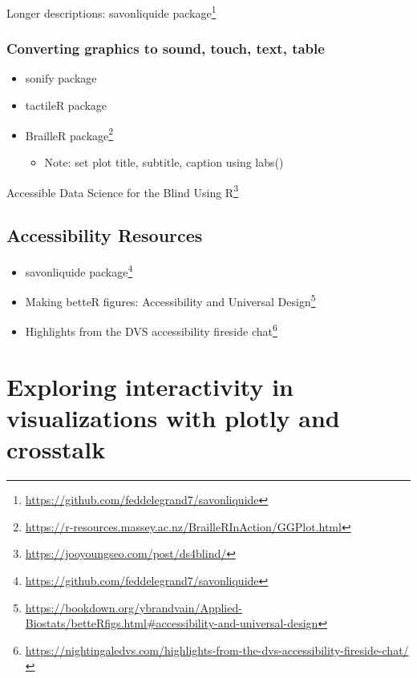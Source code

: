 \documentclass[
]{krantz}
\providecommand{\tightlist}{%
  \setlength{\itemsep}{0pt}\setlength{\parskip}{0pt}}
\renewcommand{\href}[2]{#2\footnote{\url{#1}}}
\begin{document}
Longer descriptions: \href{https://github.com/feddelegrand7/savonliquide}{savonliquide package}

\hypertarget{converting-graphics-to-sound-touch-text-table}{%
\subsection{Converting graphics to sound, touch, text, table}\label{converting-graphics-to-sound-touch-text-table}}

\begin{itemize}
\item
  sonify package
\item
  tactileR package
\item
  \href{https://r-resources.massey.ac.nz/BrailleRInAction/GGPlot.html}{BrailleR package}

  \begin{itemize}
  \tightlist
  \item
    Note: set plot title, subtitle, caption using labs()
  \end{itemize}
\end{itemize}

\href{https://jooyoungseo.com/post/ds4blind/}{Accessible Data Science for the Blind Using R}

\hypertarget{accessibility-resources}{%
\section{Accessibility Resources}\label{accessibility-resources}}

\begin{itemize}
\item
  \href{https://github.com/feddelegrand7/savonliquide}{savonliquide package}
\item
  \href{https://bookdown.org/ybrandvain/Applied-Biostats/betteRfigs.html\#accessibility-and-universal-design}{Making betteR figures: Accessibility and Universal Design}
\item
  \href{https://nightingaledvs.com/highlights-from-the-dvs-accessibility-fireside-chat/}{Highlights from the DVS accessibility fireside chat}
\end{itemize}

\hypertarget{interactive-visualizations}{%
\chapter{Exploring interactivity in visualizations with plotly and crosstalk}\label{interactive-visualizations}}
\end{document}

